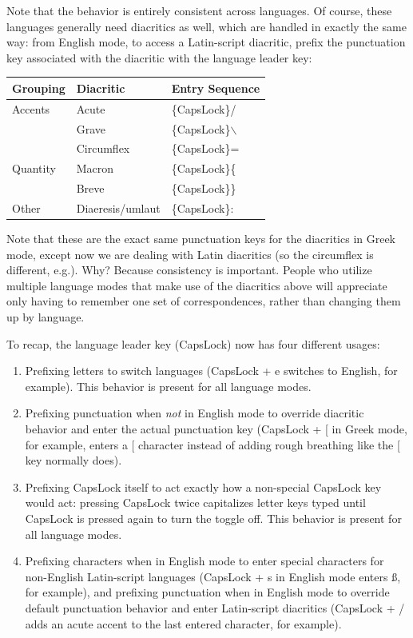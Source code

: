 \documentclass[11pt]{article}
\begin{document}
Note that the behavior is entirely consistent across languages. Of course, these languages generally need diacritics as well, which are handled in exactly the same way: from English mode, to access a Latin-script diacritic, prefix the punctuation key associated with the diacritic with the language leader key:

\begin{center}
\begin{tabular}{lll}
Grouping & Diacritic & Entry Sequence\\
\hline
Accents & Acute & \{CapsLock\}/\\
 & Grave & \{CapsLock\}$\backslash$\\
 & Circumflex & \{CapsLock\}=\\
Quantity & Macron & \{CapsLock\}\{\\
 & Breve & \{CapsLock\}\}\\
Other & Diaeresis/umlaut & \{CapsLock\}:\\
\end{tabular}
\end{center}

Note that these are the exact same punctuation keys for the diacritics in Greek mode, except now we are dealing with Latin diacritics (so the circumflex is different, e.g.). Why? Because consistency is important. People who utilize multiple language modes that make use of the diacritics above will appreciate only having to remember one set of correspondences, rather than changing them up by language.

To recap, the language leader key (CapsLock) now has four different usages:

\begin{enumerate}
\item Prefixing letters to switch languages (CapsLock + e switches to English, for example). This behavior is present for all language modes.
\item Prefixing punctuation when \emph{not} in English mode to override diacritic behavior and enter the actual punctuation key (CapsLock + [ in Greek mode, for example, enters a [ character instead of adding rough breathing like the [ key normally does).
\item Prefixing CapsLock itself to act exactly how a non-special CapsLock key would act: pressing CapsLock twice capitalizes letter keys typed until CapsLock is pressed again to turn the toggle off. This behavior is present for all language modes.
\item Prefixing characters when in English mode to enter special characters for non-English Latin-script languages (CapsLock + s in English mode enters ß, for example), and prefixing punctuation when in English mode to override default punctuation behavior and enter Latin-script diacritics (CapsLock + / adds an acute accent to the last entered character, for example).
\end{enumerate}
\end{document}
